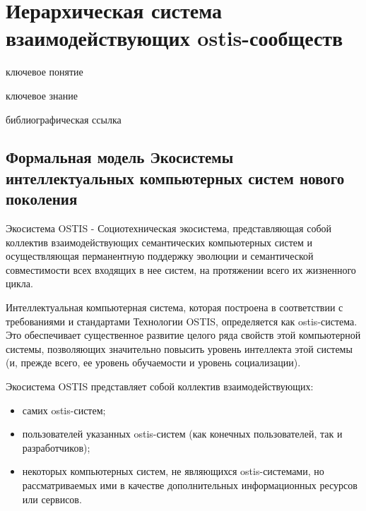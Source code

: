 \section{Иерархическая система взаимодействующих ostis-сообществ}
{\label{sec_ecosystem_structure}} 

\begin{SCn}

\bigskip

\begin{scnrelfromlist}{ключевое понятие}
\end{scnrelfromlist}

\bigskip

\begin{scnrelfromlist}{ключевое знание}
\end{scnrelfromlist}

\bigskip

\begin{scnrelfromlist}{библиографическая ссылка}
\end{scnrelfromlist}

\end{SCn}


\subsection{Формальная модель Экосистемы интеллектуальных компьютерных систем нового поколения}
{\label{sec_ecosystem_formal_model}} 

Экосистема OSTIS - Социотехническая экосистема, представляющая собой коллектив взаимодействующих семантических компьютерных систем и осуществляющая перманентную поддержку эволюции и семантической совместимости всех входящих в нее систем, на протяжении всего их жизненного цикла. 

Интеллектуальная компьютерная система, которая построена в соответствии с требованиями и стандартами Технологии OSTIS, определяется как ostis-система. 
Это обеспечивает существенное развитие целого ряда свойств этой компьютерной системы, позволяющих значительно повысить уровень интеллекта этой системы (и, прежде всего, ее уровень обучаемости и уровень социализации). 

Экосистема OSTIS представляет собой коллектив взаимодействующих:
\begin{itemize}
    \item{самих ostis-систем;}
    \item{пользователей указанных ostis-систем (как конечных пользователей, так и разработчиков);}
    \item{некоторых компьютерных систем, не являющихся ostis-системами, но рассматриваемых ими в качестве дополнительных информационных ресурсов или сервисов.}
\end{itemize}

